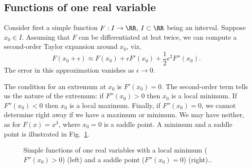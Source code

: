 \subsection{Functions of one real variable}

Consider first a simple
function $F : I \to \RR$, $I\subset \RR$ being an interval. Suppose
$x_0 \in I$. Assuming that $F$ can be differentiated at leat twice, we can compute
a second-order Taylor expansion around $x_0$, viz,
\begin{equation}
  F(x_0 + \epsilon) \approx  F(x_0) + \epsilon F'(x_0) +
  \frac{1}{2}\epsilon^2 F''(x_0) .
\end{equation}
The error in this approximation vanishes as $\epsilon\to 0$.

The condition for an extremum at $x_0$ is $F'(x_0)=0$. The
second-order term tells us the nature of the extremum: 
if $F''(x_0) > 0$ then $x_0$ is a local minimum. If $F''(x_0) < 0$
then $x_0$ is a local maximum. Finally, if $F''(x_0) = 0$, we cannot
determine right away if we have a maximum or minimum. We may have
neither, as for $F(x) = x^3$, where $x_0 = 0$ is a saddle point. A
minimum and a saddle point is illustrated in Fig.~\ref{fig:extrema-1}.

\begin{figure}
  \begin{center}


    \caption{Simple functions of one real variables with a local
      minimum ($F''(x_0)>0$) (left) and a saddle point ($F''(x_0) =
      0$) (right).\label{fig:extrema-1}.}
  \end{center}
\end{figure}


